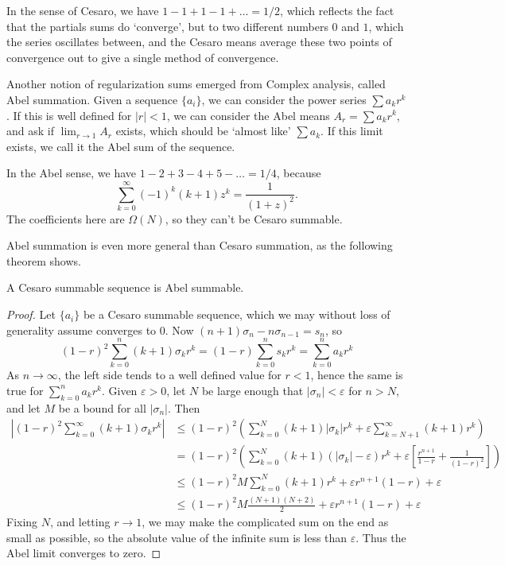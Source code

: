 \begin{example}
In the sense of Cesaro, we have $1 - 1 + 1 - 1 + \dots = 1/2$, which reflects the fact that the partials sums do `converge', but to two different numbers $0$ and $1$, which the series oscillates between, and the Cesaro means average these two points of convergence out to give a single method of convergence.
\end{example}

Another notion of regularization sums emerged from Complex analysis, called Abel summation. Given a sequence $\{ a_i \}$, we can consider the power series $\sum a_k r^k$. If this is well defined for $|r| < 1$, we can consider the Abel means $A_r = \sum a_k r^k$, and ask if $\lim_{r \to 1} A_r$ exists, which should be `almost like' $\sum a_k$. If this limit exists, we call it the Abel sum of the sequence.

\begin{example}
    In the Abel sense, we have $1 - 2 + 3 - 4 + 5 - \dots = 1/4$, because
    \[ \sum_{k = 0}^\infty (-1)^k (k + 1) z^k = \frac{1}{(1 + z)^2}. \]
    The coefficients here are $\Omega(N)$, so they can't be Cesaro summable.
\end{example}

Abel summation is even more general than Cesaro summation, as the following theorem shows.

\begin{theorem}
    A Cesaro summable sequence is Abel summable.
\end{theorem}
\begin{proof}
    Let $\{ a_i \}$ be a Cesaro summable sequence, which we may without loss of generality assume converges to $0$. Now $(n + 1)\sigma_n - n \sigma_{n-1} = s_n$, so
    \[ (1 - r)^2 \sum_{k = 0}^n (k + 1) \sigma_k r^k = (1 - r) \sum_{k = 0}^n s_k r^k = \sum_{k = 0}^n a_k r^k \]
    As $n \to \infty$, the left side tends to a well defined value for $r < 1$, hence the same is true for $\sum_{k = 0}^n a_k r^k$. Given $\varepsilon > 0$, let $N$ be large enough that $|\sigma_n| < \varepsilon$ for $n > N$, and let $M$ be a bound for all $|\sigma_n|$. Then
    \begin{align*}
        \left| (1 - r)^2 \sum_{k = 0}^\infty (k + 1) \sigma_k r^k \right| &\leq (1 - r)^2 \left( \sum_{k = 0}^N (k + 1) |\sigma_k| r^k + \varepsilon \sum_{k = N+1}^\infty (k + 1) r^k \right)\\
        &= (1 - r)^2 \left( \sum_{k = 0}^N (k + 1) (|\sigma_k| - \varepsilon) r^k + \varepsilon \left[ \frac{r^{n+1}}{1-r} + \frac{1}{(1 - r)^2} \right] \right)\\
        &\leq (1 - r)^2 M \sum_{k = 0}^N (k + 1) r^k + \varepsilon r^{n+1} (1 - r) + \varepsilon\\
        &\leq (1 - r)^2 M \frac{(N+1)(N+2)}{2} + \varepsilon r^{n+1} (1 - r) + \varepsilon
    \end{align*}
    Fixing $N$, and letting $r \to 1$, we may make the complicated sum on the end as small as possible, so the absolute value of the infinite sum is less than $\varepsilon$. Thus the Abel limit converges to zero.
\end{proof}

